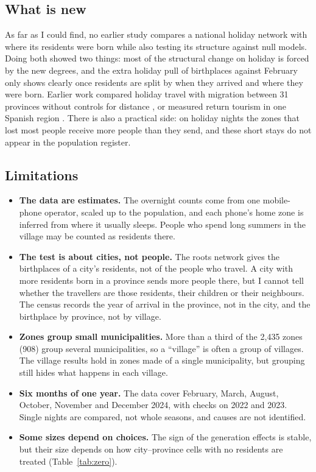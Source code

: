 \subsection{What is new}

As far as I could find, no earlier study compares a national holiday network with where its residents were born while also testing its structure against null models. Doing both showed two things: most of the structural change on holiday is forced by the new degrees, and the extra holiday pull of birthplaces against February only shows clearly once residents are split by when they arrived and where they were born. Earlier work compared holiday travel with migration between 31 provinces without controls for distance \citep{li2016spring}, or measured return tourism in one Spanish region \citep{garciagonzalez2024retorno}. There is also a practical side: on holiday nights the zones that lost most people receive more people than they send, and these short stays do not appear in the population register.

\subsection{Limitations}

\begin{itemize}
\item \textbf{The data are estimates.} The overnight counts come from one mobile-phone operator, scaled up to the population, and each phone's home zone is inferred from where it usually sleeps. People who spend long summers in the village may be counted as residents there.
\item \textbf{The test is about cities, not people.} The roots network gives the birthplaces of a city's residents, not of the people who travel. A city with more residents born in a province sends more people there, but I cannot tell whether the travellers are those residents, their children or their neighbours. The census records the year of arrival in the province, not in the city, and the birthplace by province, not by village.
\item \textbf{Zones group small municipalities.} More than a third of the 2,435 zones (908) group several municipalities, so a ``village'' is often a group of villages. The village results hold in zones made of a single municipality, but grouping still hides what happens in each village.
\item \textbf{Six months of one year.} The data cover February, March, August, October, November and December 2024, with checks on 2022 and 2023. Single nights are compared, not whole seasons, and causes are not identified.
\item \textbf{Some sizes depend on choices.} The sign of the generation effects is stable, but their size depends on how city--province cells with no residents are treated (Table~\ref{tab:zero}).
\end{itemize}

